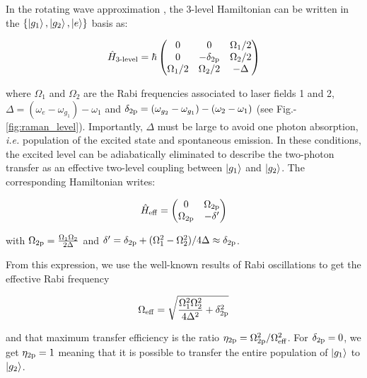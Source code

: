 In the rotating wave approximation \cite{shore1996theory}, the 3-level Hamiltonian can be written in the $\{\ket{g_1},\ket{g_2},\ket{e} \}$ basis as:

\begin{equation}
    \hat{H}_{\text{3-level}} = \hbar \begin{pmatrix}
    0 & 0 & \Omega_1/2 \\
    0 & -\delta_{\rm{2p}} & \Omega_2/2 \\
    \Omega_1/2 & \Omega_2/2 & - \Delta \\
    \end{pmatrix}
\end{equation}

\noindent where $\Omega_1$ and $\Omega_2$ are the Rabi frequencies associated to laser fields 1 and 2, $\Delta = (\omega_{e}-\omega_{g_1})-\omega_1$ and $\delta_{\rm{2p}}=(\omega_{g_2} - \omega_{g_1}) - (\omega_2-\omega_1)$ (see Fig.-\ref{fig:raman_level}). Importantly, $\Delta$ must be large to avoid one photon absorption, {\it i.e.} population of the excited state and spontaneous emission. In these conditions, the excited level can be adiabatically eliminated to describe the two-photon transfer as an effective two-level coupling between $\ket{g_1}$ and $\ket{g_2}$. The corresponding Hamiltonian writes:

\begin{equation}
    \hat{H}_{\rm{eff}} = \begin{pmatrix}
    0 & \Omega_{\rm{2p}} \\
    \Omega_{\rm{2p}} & -\delta' \\
    \end{pmatrix}
\end{equation}

\noindent with $\Omega_{\rm{2p}}=\frac{\Omega_1 \Omega_2}{2 \Delta}$ and $\delta'=\delta_{\rm{2p}} + (\Omega_1^2-\Omega_2^2)/4\Delta \approx \delta_{\rm{2p}}$.

\noindent From this expression, we use the well-known results of Rabi oscillations \cite{cohen1986mecanique} to get the effective Rabi frequency

\begin{equation}
    \Omega_{\rm{eff}}= \sqrt{\frac{\Omega_1^2 \Omega_2^2}{4 \Delta^2} + \delta_{\rm{2p}}^2}
\end{equation}

\noindent and that maximum transfer efficiency is the ratio $\eta_{\rm{2p}}=\Omega_{\rm{2p}}^2 /\Omega^2_{\rm{eff}}$. For $\delta_{\rm{2p}}=0$, we get $\eta_{\rm{2p}}=1$ meaning that it is possible to transfer the entire population of $\ket{g_1}$ to $\ket{g_2}$.



